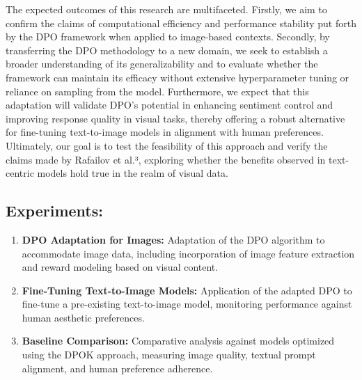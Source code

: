 \documentclass[12pt]{article}
\begin{document}
The expected outcomes of this research are multifaceted. Firstly, we aim to confirm the claims of computational efficiency and performance stability put forth by the DPO framework when applied to image-based contexts. Secondly, by transferring the DPO methodology to a new domain, we seek to establish a broader understanding of its generalizability and to evaluate whether the framework can maintain its efficacy without extensive hyperparameter tuning or reliance on sampling from the model. Furthermore, we expect that this adaptation will validate DPO's potential in enhancing sentiment control and improving response quality in visual tasks, thereby offering a robust alternative for fine-tuning text-to-image models in alignment with human preferences. Ultimately, our goal is to test the feasibility of this approach and verify the claims made by Rafailov et al.³, exploring whether the benefits observed in text-centric models hold true in the realm of visual data.
\vspace{-0.4cm}
\subsection*{Experiments:}
\small\begin{enumerate}[label=\arabic*.]
    \vspace{-0.2cm}
    \item \textbf{DPO Adaptation for Images:}
    Adaptation of the DPO algorithm to accommodate image data, including incorporation of image feature extraction and reward modeling based on visual content.
    \vspace{-0.3cm}
    \item \textbf{Fine-Tuning Text-to-Image Models:}
    Application of the adapted DPO to fine-tune a pre-existing text-to-image model, monitoring performance against human aesthetic preferences.
    \vspace{-0.3cm}
    \item \textbf{Baseline Comparison:}
    Comparative analysis against models optimized using the DPOK approach, measuring image quality, textual prompt alignment, and human preference adherence.
\end{enumerate}
\vspace{-1cm}
\end{document}
